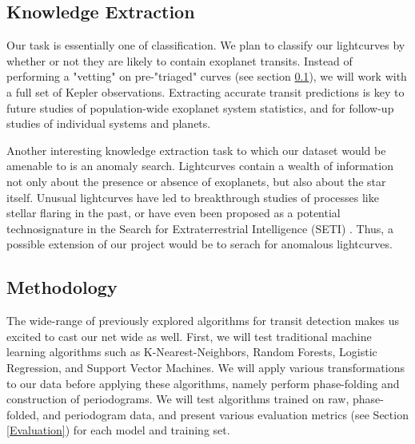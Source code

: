 \documentclass{article}
\begin{document}
\subsection{Knowledge Extraction}
\label{Knowledge_Extraction}

Our task is essentially one of classification. We plan to classify our lightcurves by whether or not they are likely to contain exoplanet transits. Instead of performing a "vetting" on pre-"triaged" curves (see section \ref{Knowledge_Extraction}), we will work with a full set of Kepler observations. Extracting accurate transit predictions is key to future studies of population-wide exoplanet system statistics, and for follow-up studies of individual systems and planets. 

Another interesting knowledge extraction task to which our dataset would be amenable to is an anomaly search. Lightcurves contain a wealth of information not only about the presence or absence of exoplanets, but also about the star itself. Unusual lightcurves have led to breakthrough studies of processes like stellar flaring in the past, or have even been proposed as a potential technosignature in the Search for Extraterrestrial Intelligence (SETI) \citep[e.g.][]{kipping2016,arnold2005}. Thus, a possible extension of our project would be to serach for anomalous lightcurves.


\subsection{Methodology}

The wide-range of previously explored algorithms for transit detection makes us excited to cast our net wide as well. First, we will test traditional machine learning algorithms such as K-Nearest-Neighbors, Random Forests, Logistic Regression, and Support Vector Machines. We will apply various transformations to our data before applying these algorithms, namely perform phase-folding and construction of periodograms. We will test algorithms trained on raw, phase-folded, and periodogram data, and present various evaluation metrics (see Section \ref{Evaluation}) for each model and training set. 
\end{document}
